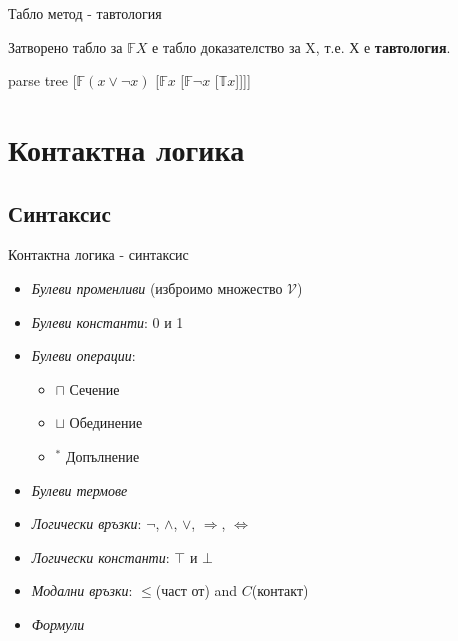 \documentclass[14pt, aspectratio=169]{beamer}
\newcommand\ST{\mathbb{T}}
\newcommand\SF{\mathbb{F}}
\newcommand\V{\mathcal{V}}
\begin{document}
\begin{frame}{Табло метод - тавтология}
	\begin{lemma}
		Затворено табло за $\SF X$ е табло доказателство за X, т.е. Х е \textbf{тавтология}.
	\end{lemma}
	\small
	\begin{example}
		\begin{center}
		\begin{forest}
			parse tree
			[$\SF (x \lor \neg x)$ [$\SF x$ [$\SF \neg x$ [$\ST x$]]]]
		\end{forest}
		\end{center}
	\end{example}
\end{frame}



\section{Контактна логика}
\subsection{Синтаксис}

\begin{frame}{Контактна логика - синтаксис}
	\begin{itemize}
		\item \textit{Булеви променливи} (изброимо множество $\V$)
		\item \textit{Булеви константи}: 0 и 1
		\item \textit{Булеви операции}:
		\begin{itemize}
			\item $\sqcap$ Сечение
			\item $\sqcup$ Обединение
			\item $^*$ Допълнение
		\end{itemize}
		\item \textit{Булеви термове}
		\item \textit{Логически връзки}: $\neg$, $\land$, $\lor$, $\Rightarrow$, $\Leftrightarrow$
		\item \textit{Логически константи}: $\top$ и $\bot$
		\item \textit{Модални връзки}: $\leq$(част от) and $C$(контакт)
		\item \textit{Формули}
	\end{itemize}
\end{frame}
\end{document}
